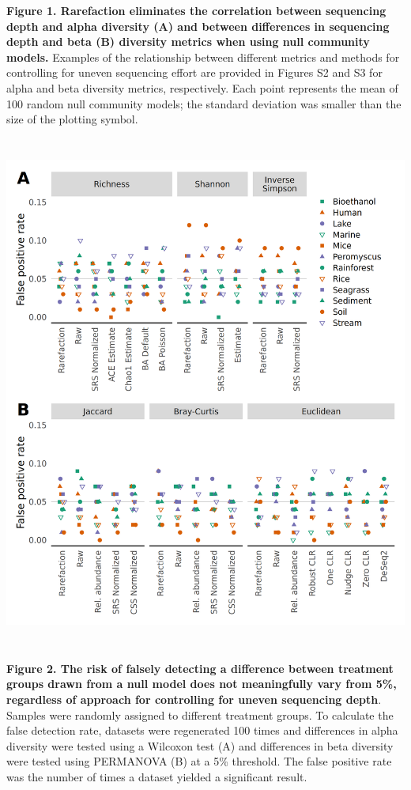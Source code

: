 \documentclass[
]{article}
\begin{document}
\textbf{Figure 1. Rarefaction eliminates the correlation between
sequencing depth and alpha diversity (A) and between differences in
sequencing depth and beta (B) diversity metrics when using null
community models.} Examples of the relationship between different
metrics and methods for controlling for uneven sequencing effort are
provided in Figures S2 and S3 for alpha and beta diversity metrics,
respectively. Each point represents the mean of 100 random null
community models; the standard deviation was smaller than the size of
the plotting symbol.

\newpage

\includegraphics[height=17cm]{figure_2.png}

\textbf{Figure 2. The risk of falsely detecting a difference between
treatment groups drawn from a null model does not meaningfully vary from
5\%, regardless of approach for controlling for uneven sequencing
depth}. Samples were randomly assigned to different treatment groups. To
calculate the false detection rate, datasets were regenerated 100 times
and differences in alpha diversity were tested using a Wilcoxon test (A)
and differences in beta diversity were tested using PERMANOVA (B) at a
5\% threshold. The false positive rate was the number of times a dataset
yielded a significant result.
\end{document}
